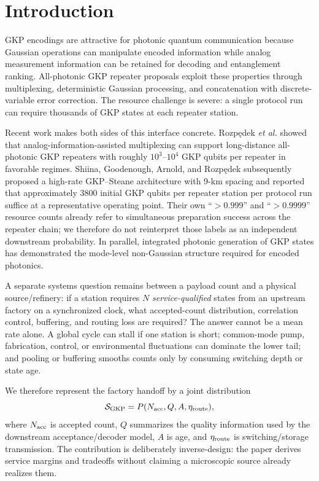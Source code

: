 \documentclass[aps,prx,reprint,superscriptaddress,nofootinbib,longbibliography,floatfix]{revtex4-2}
\begin{document}
\section{Introduction}
GKP encodings are attractive for photonic quantum communication because Gaussian operations can manipulate encoded information while analog measurement information can be retained for decoding and entanglement ranking. All-photonic GKP repeater proposals exploit these properties through multiplexing, deterministic Gaussian processing, and concatenation with discrete-variable error correction. The resource challenge is severe: a single protocol run can require thousands of GKP states at each repeater station.

Recent work makes both sides of this interface concrete. Rozp\k{e}dek \emph{et al.} showed that analog-information-assisted multiplexing can support long-distance all-photonic GKP repeaters with roughly $10^3$--$10^4$ GKP qubits per repeater in favorable regimes. Shiina, Goodenough, Arnold, and Rozp\k{e}dek subsequently proposed a high-rate GKP--Steane architecture with 9-km spacing and reported that approximately 3800 initial GKP qubits per repeater station per protocol run suffice at a representative operating point. Their own ``$>0.999$'' and ``$>0.9999$'' resource counts already refer to simultaneous preparation success across the repeater chain; we therefore do not reinterpret those labels as an independent downstream probability. In parallel, integrated photonic generation of GKP states has demonstrated the mode-level non-Gaussian structure required for encoded photonics.

A separate systems question remains between a payload count and a physical source/refinery: if a station requires $N$ \emph{service-qualified} states from an upstream factory on a synchronized clock, what accepted-count distribution, correlation control, buffering, and routing loss are required? The answer cannot be a mean rate alone. A global cycle can stall if one station is short; common-mode pump, fabrication, control, or environmental fluctuations can dominate the lower tail; and pooling or buffering smooths counts only by consuming switching depth or state age.

We therefore represent the factory handoff by a joint distribution
\begin{equation}
\mathcal S_{\rm GKP}=P(N_{\rm acc},Q,A,\eta_{\rm route}),
\end{equation}
where $N_{\rm acc}$ is accepted count, $Q$ summarizes the quality information used by the downstream acceptance/decoder model, $A$ is age, and $\eta_{\rm route}$ is switching/storage transmission. The contribution is deliberately inverse-design: the paper derives service margins and tradeoffs without claiming a microscopic source already realizes them.
\end{document}
